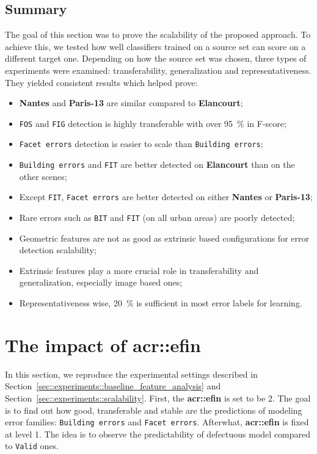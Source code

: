     \subsection{Summary}
        \label{subsec::experiments::scalability::summary}
        The goal of this section was to prove the scalability of the proposed approach.
        To achieve this, we tested how well classifiers trained on a source set can score on a different target one.
        Depending on how the source set was chosen, three types of experiments were examined: transferability, generalization and representativeness.
        They yielded consistent results which helped prove:
        \begin{itemize}[label=\(\blacktriangleright\)]
            \item \textbf{Nantes} and \textbf{Paris-13} are similar compared to \textbf{Elancourt};
            \item \texttt{FOS} and \texttt{FIG} detection is highly transferable with over \SI{95}{\percent} in F-score;
            \item \texttt{Facet errors} detection is easier to scale than \texttt{Building errors};
            \item \texttt{Building errors} and \texttt{FIT} are better detected on \textbf{Elancourt} than on the other scenes;
            \item Except \texttt{FIT}, \texttt{Facet errors} are better detected on either \textbf{Nantes} or \textbf{Paris-13};
            \item Rare errors such as \texttt{BIT} and \texttt{FIT} (on all urban areas) are poorly detected;
            \item Geometric features are not as good as extrinsic based configurations for error detection scalability;
            \item Extrinsic features play a more crucial role in transferability and generalization, especially image based ones;
            \item Representativeness wise, \SI{20}{\percent} is sufficient in most error labels for learning.
        \end{itemize}

\section{The impact of \texorpdfstring{\acrshort*{acr::efin}}{eFin}}
    \label{sec::experiments::finesse}
    In this section, we reproduce the experimental settings described in Section~\ref{sec::experiments::baseline_feature_analysis} and Section~\ref{sec::experiments::scalability}.
    First, the \textbf{\gls{acr::efin}} is set to be 2.
    The goal is to find out how good, transferable and stable are the predictions of modeling error families: \texttt{Building errors} and \texttt{Facet errors}.
    Afterwhat, \textbf{\gls{acr::efin}} is fixed at level 1.
    The idea is to observe the predictability of defectuous model compared to \texttt{Valid} ones.
    
